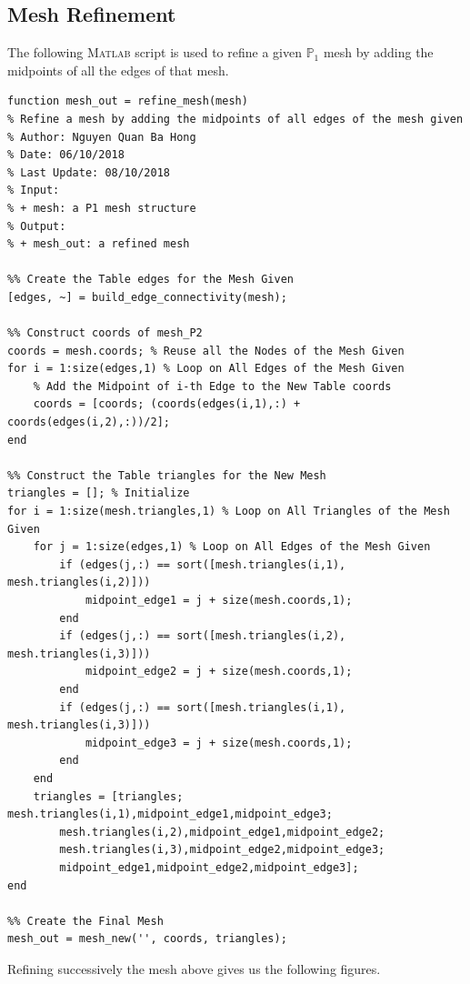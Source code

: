 \documentclass[11pt,a4paper,center,notitlepage]{article}
\numberwithin{equation}{section}
\begin{document}
\subsection{Mesh Refinement}
The following \textsc{Matlab} script is used to refine a given $\mathbb{P}_1$ mesh by adding the midpoints of all the edges of that mesh.
\begin{verbatim}
function mesh_out = refine_mesh(mesh)
% Refine a mesh by adding the midpoints of all edges of the mesh given
% Author: Nguyen Quan Ba Hong
% Date: 06/10/2018
% Last Update: 08/10/2018
% Input: 
% + mesh: a P1 mesh structure
% Output:
% + mesh_out: a refined mesh

%% Create the Table edges for the Mesh Given
[edges, ~] = build_edge_connectivity(mesh);

%% Construct coords of mesh_P2
coords = mesh.coords; % Reuse all the Nodes of the Mesh Given
for i = 1:size(edges,1) % Loop on All Edges of the Mesh Given
    % Add the Midpoint of i-th Edge to the New Table coords
    coords = [coords; (coords(edges(i,1),:) + coords(edges(i,2),:))/2];
end

%% Construct the Table triangles for the New Mesh
triangles = []; % Initialize
for i = 1:size(mesh.triangles,1) % Loop on All Triangles of the Mesh Given
    for j = 1:size(edges,1) % Loop on All Edges of the Mesh Given
        if (edges(j,:) == sort([mesh.triangles(i,1), mesh.triangles(i,2)]))
            midpoint_edge1 = j + size(mesh.coords,1);
        end
        if (edges(j,:) == sort([mesh.triangles(i,2), mesh.triangles(i,3)]))
            midpoint_edge2 = j + size(mesh.coords,1);
        end
        if (edges(j,:) == sort([mesh.triangles(i,1), mesh.triangles(i,3)]))
            midpoint_edge3 = j + size(mesh.coords,1);
        end
    end
    triangles = [triangles; mesh.triangles(i,1),midpoint_edge1,midpoint_edge3;
        mesh.triangles(i,2),midpoint_edge1,midpoint_edge2;
        mesh.triangles(i,3),midpoint_edge2,midpoint_edge3;
        midpoint_edge1,midpoint_edge2,midpoint_edge3];
end

%% Create the Final Mesh
mesh_out = mesh_new('', coords, triangles);
\end{verbatim}
Refining successively the mesh above gives us the following figures.
\end{document}
